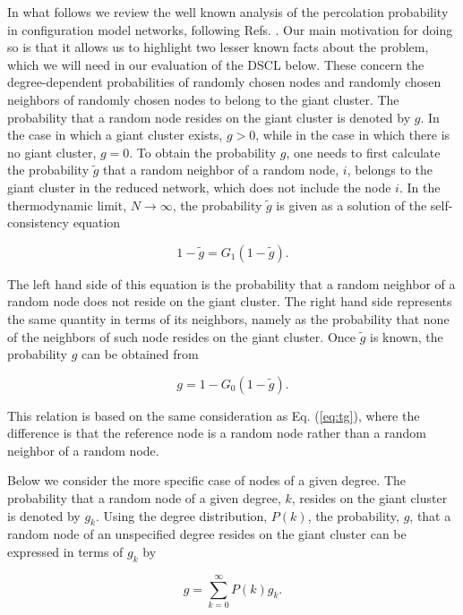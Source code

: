 \documentclass[preprint,pre,superscriptaddress,showpacs]{revtex4}
\begin{document}
In what follows we review the well known analysis of the percolation probability 
in configuration model networks, following Refs.  
\cite{Havlin2010,Newman2010}.
Our main motivation for 
doing so is that it allows us to highlight two lesser known facts about the problem, 
which we will need in our evaluation of the DSCL below. These concern the 
degree-dependent probabilities of randomly chosen nodes and randomly 
chosen neighbors of randomly chosen nodes to belong to the giant cluster. 
The probability that a random node resides on the giant
cluster is denoted by $g$. In the case in which a giant cluster
exists, $g > 0$, while in the case in which there is no giant cluster, $g=0$. 
To obtain the probability $g$, 
one needs to first calculate the probability $\tilde g$
that a random neighbor of a random node, $i$, 
belongs to the giant cluster in the reduced network, 
which does not include the node $i$.
In the thermodynamic limit, $N \rightarrow \infty$,
the probability $\tilde g$ is given as a solution of the
self-consistency equation
\cite{Havlin2010}

\begin{equation}
1 - {\tilde g} = G_1(1 - {\tilde g}).
\label{eq:tg}
\end{equation}

\noindent
The left hand side of this equation is the probability that a random neighbor of
a random node does not reside on the giant cluster.
The right hand side represents the same quantity in terms of its neighbors, namely as the probability that
none of the neighbors of such node resides on the giant cluster.
Once $\tilde g$ is known, the probability $g$ can be obtained from

\begin{equation}
g = 1 - G_0(1 - {\tilde g}).
\label{eq:g}
\end{equation}

\noindent
This relation is based on the same consideration as Eq. (\ref{eq:tg}),
where the difference is that the reference node is a random node rather
than a random neighbor of a random node.

Below we consider the more specific case of nodes of a given degree.
The probability that a random node of a given degree, $k$, resides on the 
giant cluster is denoted by $g_k$.
Using the degree distribution, $P(k)$, the
probability, $g$, that a random 
node of an unspecified degree resides on the giant cluster can
be expressed in terms of $g_k$ by

\begin{equation}
g = \sum_{k=0}^{\infty} P(k) g_k.
\label{eq:g_k}
\end{equation}
\end{document}

